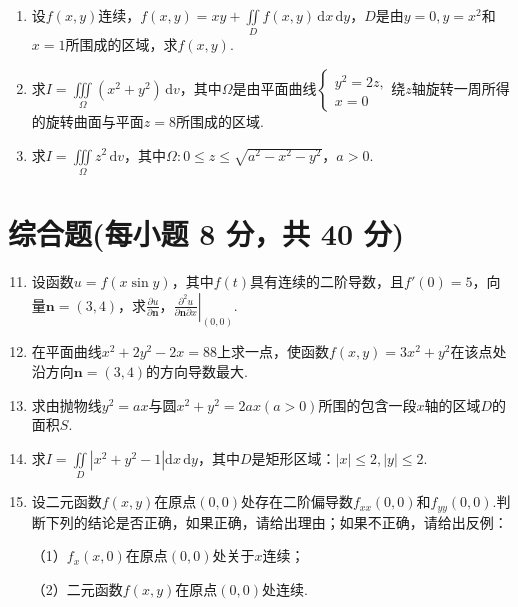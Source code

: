 \documentclass[../Main.tex]{subfiles}
\begin{document}
\begin{enumerate}
    \item 设$f(x,y)$连续，$f(x,y)=xy+\iint\limits_{D}f(x,y)\,\mathrm{d}x\,\mathrm{d}y$，$D$是由$y
              =0,y=x^{2}$和$x=1$所围成的区域，求$f(x,y)$.
          \vspace{11em}

    \item 求$I=\iiint\limits_{\Omega}\left(x^{2}+y^{2}\right)\,\mathrm{d}v$，其中$\Omega$是由平面曲线$\begin{cases}
                  y^{2}=2z, \\
                  x=0
              \end{cases}$绕$z$轴旋转一周所得的旋转曲面与平面$z=8$所围成的区域.
          \vspace{11em}

    \item 求$I=\iiint\limits_{\Omega}z^{2}\,\mathrm{d}v$，其中$\Omega:0\leq z \leq \sqrt{a^{2}-x^{2}-y^{2}}$，$a
              >0$.
          \vspace{11em}
\end{enumerate}

\section{综合题(每小题 8 分，共 40 分)}
\begin{enumerate}
    \setcounter{enumi}{10}

    \item 设函数$u=f(x\sin y)$，其中$f(t)$具有连续的二阶导数，且$f'(0)=5$，向量$\boldsymbol
              {n}=(3,4)$，求$\frac{\partial u}{\partial \boldsymbol{n}}$，$\left.\frac{\partial^{2}
                  u}{\partial \boldsymbol{n}\partial x}\right|_{(0,0)}$.
          \vspace{10em}

    \item 在平面曲线$x^{2}+2y^{2}-2x=88$上求一点，使函数$f(x,y)=3x^{2}+y^{2}$在该点处沿方向$\boldsymbol
              {n}=(3,4)$的方向导数最大.
          \vspace{11em}

    \item 求由抛物线$y^{2}=ax$与圆$x^{2}+y^{2}=2ax(a>0)$所围的包含一段$x$轴的区域$D$的面积$S$.
          \vspace{11em}

    \item 求$I=\iint\limits_{D}\left|x^{2}+y^{2}-1\right|\mathrm{d}x\,\mathrm{d}y$，其中$D$是矩形区域：$|
              x|\leq 2, |y|\leq 2$.
          \vspace{11em}

    \item 设二元函数$f(x,y)$在原点$(0,0)$处存在二阶偏导数$f_{xx}(0,0)$和$f_{yy}(0
              ,0)$.判断下列的结论是否正确，如果正确，请给出理由；如果不正确，请给出反例：

          （1）$f_{x}(x,0)$在原点$(0,0)$处关于$x$连续；

          （2）二元函数$f(x,y)$在原点$(0,0)$处连续.
          \vspace{11em}
\end{enumerate}
\end{document}
